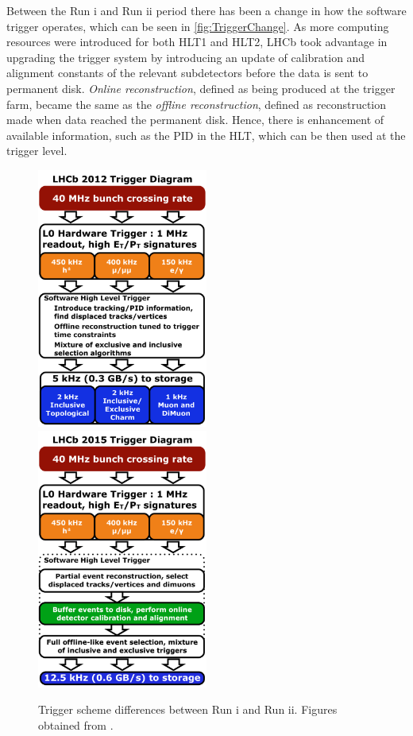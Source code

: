 Between the Run \Rn{1} and Run \Rn{2} period there has been a change in how the software trigger operates, which can be seen in \autoref{fig:TriggerChange}. As more computing resources were introduced for both \Gls{HLT1} and \Gls{HLT2}, \Gls{LHCb} took advantage in upgrading the trigger system by introducing an update of calibration and alignment constants of the relevant subdetectors before the data is sent to permanent disk. \textit{Online reconstruction}, defined as being produced at the trigger farm, became the same as the \textit{offline reconstruction}, defined as reconstruction made when data reached the permanent disk. Hence, there is enhancement of available information, such as the \Gls{PID} in the \Gls{HLT}, which can be then used at the trigger level. 


\begin{figure}[!h]
	\centering
	\includegraphics[width = 0.5\textwidth]{figs/detector/LHCb_Trigger_RunIAlg.pdf}%
	\includegraphics[width = 0.5\textwidth]{figs/detector/LHCb_Trigger_RunII.pdf}%
	\caption{Trigger scheme differences between Run \Rn{1} and Run \Rn{2}. Figures obtained from \cite{triggerscheme}.}  
	\label{fig:TriggerChange}
\end{figure}


